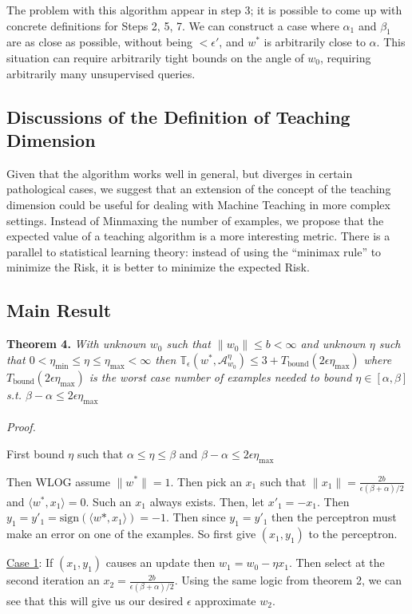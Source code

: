 \documentclass{article}
\newcommand{\learn}{\mathcal{A}_{w_0}^\eta}
\begin{document}
The problem with this algorithm appear in step 3; it is possible to come up with
concrete definitions for Steps 2, 5, 7. We can construct a case where
$\alpha_1$ and $\beta_1$ are as close as possible, without being $ < \epsilon'$,
and $w^*$ is arbitrarily close to $\alpha$. This situation can require
arbitrarily tight bounds on the angle of $w_0$, requiring arbitrarily many
unsupervised queries.
\subsection{Discussions of the Definition of Teaching Dimension}
Given that the algorithm works well in general, but diverges in certain pathological
cases, we suggest that an extension of the concept of the teaching dimension
could be useful for dealing with Machine Teaching in more complex settings.
Instead of Minmaxing the number of examples, we propose that the expected value
of a teaching algorithm is a more interesting metric. There is a parallel to
statistical learning theory: instead of using the ``minimax
rule'' to minimize the Risk, it is better to minimize the expected Risk.

\subsection{Main Result}
\textbf{Theorem 4.} 
\textit{With unknown $w_0$ such that $\lVert w_0 \rVert \leq b < \infty$
and unknown $\eta$ such that $0 < \eta_{\min} \leq \eta \leq \eta_{\max} < \infty$ then 
$
\mathbb{T}_\epsilon(w^* , \learn) \leq 3 + T_{\text{bound}}(2\epsilon \eta_{\max})
$
where $T_{\text{bound}}(2\epsilon \eta_{\max})$ is the worst case number of examples needed to bound $\eta \in [\alpha , \beta]$ s.t. $\beta - \alpha \leq 2\epsilon \eta_{\max}$
}
\\
\\
\textit{Proof.}

First bound $\eta$ such that $ \alpha \leq \eta \leq \beta$ and $\beta - \alpha \leq 2\epsilon \eta_{\max}$

Then WLOG assume $\lVert w^* \rVert = 1$. Then pick an $x_1$ such that 
$\lVert x_1 \rVert = \frac{2b}{\epsilon (\beta + \alpha)/2}$ and $\langle w^*, x_1 \rangle = 0$. Such an $x_1$ always exists. Then, let $x'_1 = -x_1.$ Then $y_1 = y'_1 = \text{sign}(\langle w*, x_1 \rangle) = -1$.  Then since $y_1 = y'_1$ then the perceptron must make an error on one of the examples. So first give $(x_1, y_1)$ to the perceptron.

\underline{Case 1}: If $(x_1, y_1)$ causes an update then $w_1 = w_0 - \eta x_1$. 
Then select at the second iteration an $x_2 = \frac{2b}{\epsilon (\beta + \alpha)/2}$. Using the same logic from theorem 2, we can see that this will give us our desired $\epsilon$ approximate $w_2$. 
\end{document}

